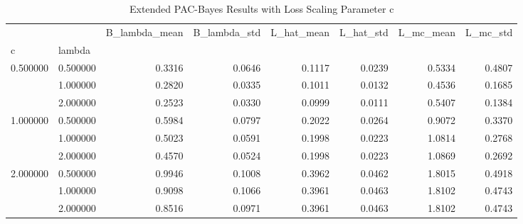 \begin{table}
\caption{Extended PAC-Bayes Results with Loss Scaling Parameter c}
\label{tab:extended_results}
\begin{tabular}{llrrrrrr}
\toprule
 &  & B_lambda_mean & B_lambda_std & L_hat_mean & L_hat_std & L_mc_mean & L_mc_std \\
c & lambda &  &  &  &  &  &  \\
\midrule
\multirow[t]{3}{*}{0.500000} & 0.500000 & 0.3316 & 0.0646 & 0.1117 & 0.0239 & 0.5334 & 0.4807 \\
 & 1.000000 & 0.2820 & 0.0335 & 0.1011 & 0.0132 & 0.4536 & 0.1685 \\
 & 2.000000 & 0.2523 & 0.0330 & 0.0999 & 0.0111 & 0.5407 & 0.1384 \\
\cline{1-8}
\multirow[t]{3}{*}{1.000000} & 0.500000 & 0.5984 & 0.0797 & 0.2022 & 0.0264 & 0.9072 & 0.3370 \\
 & 1.000000 & 0.5023 & 0.0591 & 0.1998 & 0.0223 & 1.0814 & 0.2768 \\
 & 2.000000 & 0.4570 & 0.0524 & 0.1998 & 0.0223 & 1.0869 & 0.2692 \\
\cline{1-8}
\multirow[t]{3}{*}{2.000000} & 0.500000 & 0.9946 & 0.1008 & 0.3962 & 0.0462 & 1.8015 & 0.4918 \\
 & 1.000000 & 0.9098 & 0.1066 & 0.3961 & 0.0463 & 1.8102 & 0.4743 \\
 & 2.000000 & 0.8516 & 0.0971 & 0.3961 & 0.0463 & 1.8102 & 0.4743 \\
\cline{1-8}
\bottomrule
\end{tabular}
\end{table}
